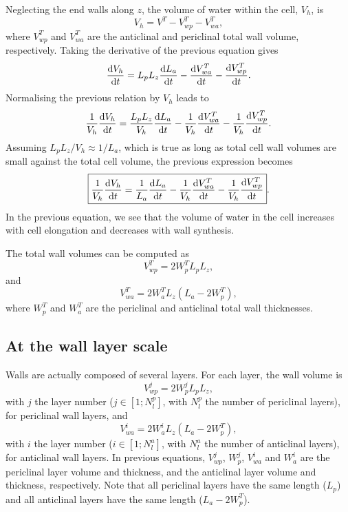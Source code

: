 \documentclass[]{article}
\begin{document}
Neglecting the end walls along $z$, the volume of water within the cell, $V_h$, is
\begin{equation}
	V_h = V^T - V_{wp}^T - V_{wa}^T,
\end{equation}
where $V_{wp}^T$ and $V_{wa}^T$ are the anticlinal and periclinal total wall volume, respectively. Taking the derivative of the previous equation gives
\begin{equation}
	\frac{{\rm d} V_h}{{\rm d} t}=L_pL_z\frac{{\rm d} L_a}{{\rm d} t} - \frac{{\rm d} V_{wa}^T}{{\rm d} t} - \frac{{\rm d} V_{wp}^T}{{\rm d} t}.
\end{equation}
Normalising the previous relation by $V_h$ leads to
\begin{equation}
	\frac{1}{V_h}\frac{{\rm d} V_h}{{\rm d} t}=\frac{L_pL_z}{V_h}\frac{{\rm d} L_a}{{\rm d} t} - \frac{1}{V_h}\frac{{\rm d} V_{wa}^T}{{\rm d} t} - \frac{1}{V_h}\frac{{\rm d} V_{wp}^T}{{\rm d} t}.
\end{equation}
Assuming $L_pL_z/V_h \approx 1/L_a$, which is true as long as total cell wall volumes are small against the total cell volume, the previous expression becomes
\begin{equation}\label{kinematic}
	\boxed{
	\frac{1}{V_h}\frac{{\rm d} V_h}{{\rm d} t}=\frac{1}{L_a}\frac{{\rm d} L_a}{{\rm d} t} - \frac{1}{V_h}\frac{{\rm d} V_{wa}^T}{{\rm d} t} - \frac{1}{V_h}\frac{{\rm d} V_{wp}^T}{{\rm d} t}}.
\end{equation}
In the previous equation, we see that the volume of water in the cell increases with cell elongation and decreases with wall synthesis.

The total wall volumes can be computed as
\begin{equation}
	V_{wp}^T=2W_p^TL_pL_z,
\end{equation}
and
\begin{equation}
	V_{wa}^T=2W_a^TL_z(L_a-2W_p^T),
\end{equation}
where $W_p^T$ and $W_a^T$ are the periclinal and anticlinal total wall thicknesses.


\subsection{At the wall layer scale}
Walls are actually composed of several layers. For each layer, the wall volume is
\begin{equation}\label{periclinal_layer}
	V_{wp}^j=2W_p^jL_pL_z,
\end{equation}
with $j$ the layer number ($j \in [1;N_l^p]$, with $N_l^p$ the number of periclinal layers), for periclinal wall layers, and
\begin{equation}\label{anticlinal_layer}
	V_{wa}^i=2W_a^i L_z(L_a-2W_p^T),
\end{equation}
with $i$ the layer number ($i \in [1;N_l^a]$, with $N_l^a$ the number of anticlinal layers), for anticlinal wall layers. In previous equations, $V_{wp}^j$, $W_p^j$, $V_{wa}^i$ and $W_a^i$ are the periclinal layer volume and thickness, and the anticlinal layer volume and thickness, respectively. Note that all periclinal layers have the same length ($L_p$) and all anticlinal layers have the same length ($L_a-2W_p^T$).
\end{document}

